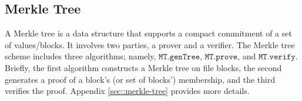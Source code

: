 


\vs

\subsection{Merkle Tree}\label{sec::merkle-tree-short}
\svs

A Merkle tree is a data structure that supports a compact commitment of a set of values/blocks.  It involves two parties, a prover and a verifier. 
%
The Merkle tree scheme includes three algorithms; namely, $\mathtt{MT.genTree}$, $ \mathtt{MT.prove}$, and  $\mathtt{MT.verify}$. Briefly, the first algorithm constructs a Merkle tree on file blocks, the second generates a proof of a block's (or set of blocks') membership, and the third verifies the proof. Appendix \ref{sec::merkle-tree} provides more details. 

%
%
%
%
%
%
